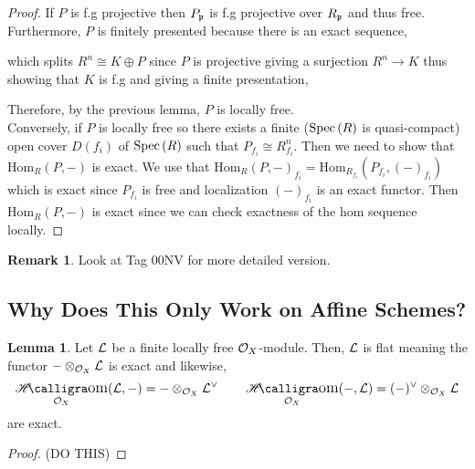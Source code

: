 \documentclass[12pt]{extarticle}
\DeclareMathOperator{\calHom}{\mathscr{H}\text{\kern -3pt {\calligra\large om}}}
\newcommand{\shHom}[3]{\calHom_{#1} \! \left( #2, #3 \right)}
\newcommand{\Hom}[3]{\mathrm{Hom}_{#1}\left( #2, #3 \right)}
\theoremstyle{definition}
\newtheorem{lemma}[theorem]{Lemma}
\newtheorem{remark}{Remark}
\begin{document}
\begin{proof}
If $P$ is f.g projective then $P_{\mathfrak{p}}$ is f.g projective over $R_{\mathfrak{p}}$ and thus free. Furthermore, $P$ is finitely presented because there is an exact sequence,
\begin{center}
\end{center}
which splits $R^n \cong K \oplus P$ since $P$ is projective giving a surjection $R^n \to K$ thus showing that $K$ is f.g and giving a finite presentation,
\begin{center}
\end{center}
Therefore, by the previous lemma, $P$ is locally free. 
\bigskip\\
Conversely, if $P$ is locally free so there exists a finite ($\mathrm{Spec}\left(R\right)$ is quasi-compact) open cover $D(f_i)$ of $\mathrm{Spec}\left(R\right)$ such that $P_{f_i} \cong R_{f_i}^n$. Then we need to show that $\Hom{R}{P}{-}$ is exact. We use that $\Hom{R}{P}{-}_{f_i} = \Hom{R_{f_i}}{P_{f_i}}{(-)_{f_i}}$ which is exact since $P_{f_i}$ is free and localization $(-)_{f_i}$ is an exact functor. Then $\Hom{R}{P}{-}$ is exact since we can check exactness of the hom sequence locally. 
\end{proof}

\begin{remark}
Look at Tag 00NV for more detailed version.
\end{remark}

\subsection{Why Does This Only Work on Affine Schemes?}

\begin{lemma}
Let $\mathcal{L}$ be a finite locally free $\mathcal{O}_{X}$-module. Then, $\mathcal{L}$ is flat meaning the functor $- \otimes_{\mathcal{O}_{X}} \mathcal{L}$ is exact and likewise,
\[ \shHom{\struct{X}}{\L}{-} = - \otimes_{\struct{X}} \L^\vee \quad \quad \shHom{\struct{X}}{-}{\L} = (-)^\vee \otimes_{\struct{X}} \L \]
are exact. 
\end{lemma}

\begin{proof}
(DO THIS) 
\end{proof}
\end{document}
